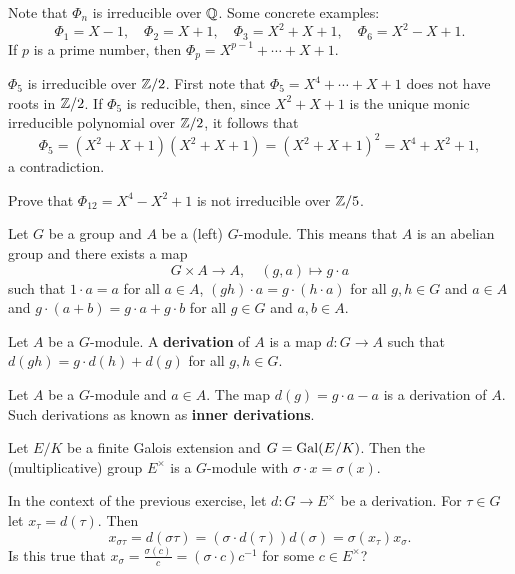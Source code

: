 Note that $\Phi_n$ is irreducible over $\mathbb{Q}$. Some concrete examples:
\[
\Phi_1=X-1,
\quad
\Phi_2=X+1,
\quad
\Phi_3=X^2+X+1,
\quad
\Phi_6=X^2-X+1.
\]
If $p$ is a prime number, then $\Phi_p=X^{p-1}+\cdots+X+1$. 

\begin{example}
    $\Phi_5$ is irreducible over $\mathbb{Z}/2$. First note that
    $\Phi_5=X^{4}+\cdots+X+1$ does not have roots in $\mathbb{Z}/2$. If 
    $\Phi_5$ is reducible, then, since
    $X^2+X+1$ is the unique monic irreducible polynomial 
    over $\mathbb{Z}/2$, it follows that
    \[
    \Phi_5=(X^2+X+1)(X^2+X+1)=(X^2+X+1)^2=X^4+X^2+1,
    \]
    a contradiction.
\end{example}

\begin{exercise}
Prove that
$\Phi_{12}=X^4-X^2+1$ is not irreducible over $\mathbb{Z}/5$. 
\end{exercise}


Let $G$ be a group and $A$ be a (left) $G$-module. This means that $A$ is an abelian
group and there exists a map
\[
G\times A\to A,\quad
(g,a)\mapsto g\cdot a
\]
such that $1\cdot a=a$ for all $a\in A$, $(gh)\cdot a=g\cdot (h\cdot a)$ for 
all $g,h\in G$ and $a\in A$ and $g\cdot (a+b)=g\cdot a+g\cdot b$ for
all $g\in G$ and $a,b\in A$. 

\begin{definition}
    Let $A$ be a $G$-module. 
    A \textbf{derivation} of $A$ is a map $d\colon G\to A$ such that
    $d(gh)=g\cdot d(h)+d(g)$ for all $g,h\in G$. 
\end{definition}

Let $A$ be a $G$-module and $a\in A$. The map 
$d(g)=g\cdot a-a$ is a derivation of $A$. 
Such derivations as known as \textbf{inner derivations}. 

\begin{exercise}
    Let $E/K$ be a finite Galois extension and $G=\operatorname{Gal}(E/K)$. 
    Then the (multiplicative) group $E^\times$ is a $G$-module with
    $\sigma\cdot x=\sigma(x)$. 
\end{exercise}

In the context of the previous exercise, 
let $d\colon G\to E^\times$ be a derivation. For $\tau\in G$ let 
$x_\tau=d(\tau)$. Then
\[
x_{\sigma\tau}=d(\sigma\tau)=(\sigma\cdot d(\tau))d(\sigma)=\sigma(x_\tau)x_\sigma.
\]
Is this true that $x_\sigma=\frac{\sigma(c)}{c}=(\sigma\cdot c)c^{-1}$ 
for some $c\in E^\times$?

